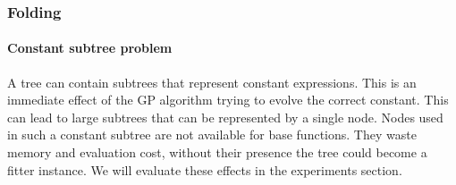 \subsubsection{Folding}

\paragraph{Constant subtree problem}
A tree can contain subtrees that represent constant expressions. This is an immediate effect of the GP algorithm trying to evolve the correct constant. This can lead to large subtrees that can be represented by a single node. Nodes used in such a constant subtree are not available for base functions. They waste memory and evaluation cost, without their presence the tree could become a fitter instance. We will evaluate these effects in the experiments section.

